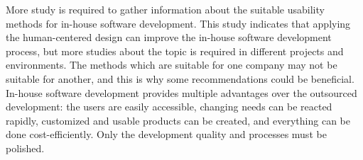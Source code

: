 \documentclass[12pt,a4paper,oneside,pdftex]{report}
\begin{document}
More study is required to gather information about the suitable usability methods for in-house software development. This study indicates that applying the human-centered design can improve the in-house software development process, but more studies about the topic is required in different projects and environments. The methods which are suitable for one company may not be suitable for another, and this is why some recommendations could be beneficial. In-house software development provides multiple advantages over the outsourced development: the users are easily accessible, changing needs can be reacted rapidly, customized and usable products can be created, and everything can be done cost-efficiently. Only the development quality and processes must be polished.

%	
	
%	
\end{document}
